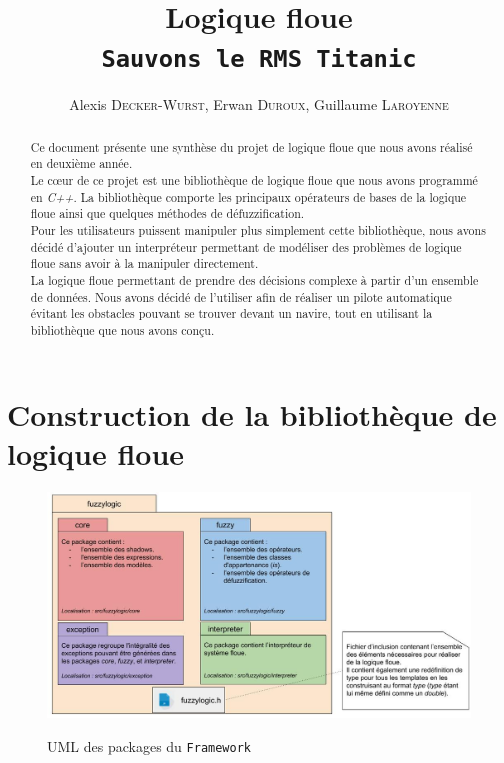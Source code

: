 \documentclass[a4paper,11pt]{article}
\title{Logique floue\\\texttt{Sauvons le RMS Titanic}}
\author{Alexis \textsc{Decker-Wurst}, Erwan  \textsc{Duroux}, Guillaume  \textsc{Laroyenne}}
\begin{document}
    \maketitle

    \begin{abstract}
        Ce document présente une synthèse du projet de logique floue que nous avons réalisé en deuxième année.\\
        Le cœur de ce projet est une bibliothèque de logique floue que nous avons programmé en \textit{C++}. La bibliothèque comporte les principaux opérateurs de bases de la logique floue ainsi que quelques méthodes de défuzzification.\\
        Pour les utilisateurs puissent manipuler plus simplement cette bibliothèque, nous avons décidé d'ajouter un interpréteur permettant de modéliser des problèmes de logique floue sans avoir à la manipuler directement.\\
        La logique floue permettant de prendre des décisions complexe à partir d'un ensemble de données. Nous avons décidé de l'utiliser afin de réaliser un pilote automatique évitant les obstacles pouvant se trouver devant un navire, tout en utilisant la bibliothèque que nous avons conçu.
    \end{abstract}

    \section{Construction de la bibliothèque de logique floue}

    \begin{figure}
        \begin{center}
            \caption{UML des packages du \texttt{Framework}}
            \includegraphics[scale=0.5]{assets/Packages_(UML).jpg}
            \label{fig:umlPackage}
        \end{center}
    \end{figure}
\end{document}
